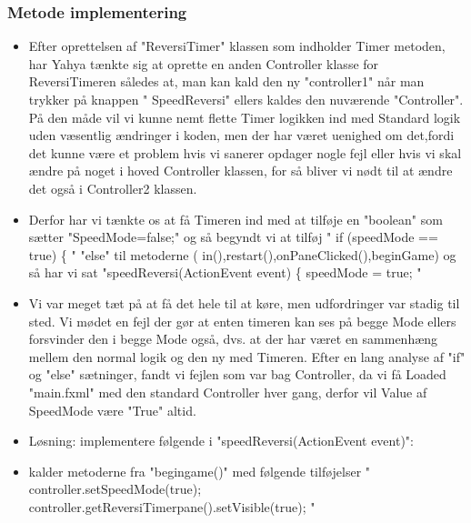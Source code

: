 \subsubsection{Metode implementering}\label{MI}
\begin{itemize}
\item Efter oprettelsen af "ReversiTimer" klassen som indholder Timer metoden, har Yahya tænkte sig at oprette en anden Controller klasse for ReversiTimeren således at, man kan kald den ny "controller1" når man trykker på knappen " SpeedReversi" ellers kaldes den nuværende "Controller".
På den måde vil vi kunne nemt flette Timer logikken ind med Standard logik uden væsentlig ændringer i koden, men der har været uenighed om det,fordi det kunne være et problem hvis vi sanerer opdager nogle fejl eller hvis vi skal ændre på noget i hoved Controller klassen, for så bliver vi nødt til at ændre det også i Controller2 klassen. 
\item Derfor har vi tænkte os at få Timeren ind med at tilføje en "boolean" som sætter "SpeedMode=false;" og så begyndt vi at tilføj 
" if (speedMode == true) \{ " "else" til metoderne ( in(),restart(),onPaneClicked(),beginGame) og så har vi sat 
"speedReversi(ActionEvent event) \{	
		speedMode = true; "
\item Vi var meget tæt på at få det hele til at køre, men udfordringer var stadig til sted. Vi mødet en fejl der gør at enten timeren kan ses på begge Mode ellers forsvinder den i begge Mode også, dvs. at der har været en sammenhæng mellem den normal logik og den ny med Timeren.
Efter en lang analyse af "if" og "else" sætninger, fandt vi fejlen som var bag Controller, da vi få Loaded "main.fxml" med den standard Controller hver gang, derfor vil Value af SpeedMode være "True" altid. 

\item Løsning: 
implementere følgende i "speedReversi(ActionEvent event)":
\item kalder metoderne fra "begingame()" med følgende tilføjelser 
" controller.setSpeedMode(true);
            controller.getReversiTimerpane().setVisible(true); " 


\end{itemize}








